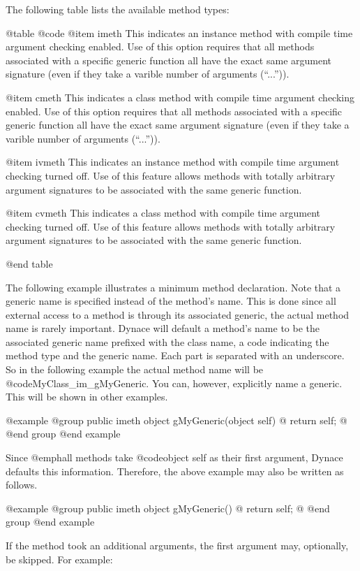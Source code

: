 The following table lists the available method types:

@table @code
@item imeth
This indicates an instance method with compile time argument checking
enabled.  Use of this option requires that all methods associated
with a specific generic function all have the exact same argument
signature (even if they take a varible number of arguments (``...'')).

@item cmeth
This indicates a class method with compile time argument checking
enabled.  Use of this option requires that all methods associated with
a specific generic function all have the exact same argument signature
(even if they take a varible number of arguments (``...'')).

@item ivmeth
This indicates an instance method with compile time argument checking
turned off.  Use of this feature allows methods with totally arbitrary
argument signatures to be associated with the same generic function.

@item cvmeth
This indicates a class method with compile time argument checking
turned off.  Use of this feature allows methods with totally arbitrary
argument signatures to be associated with the same generic function.


@end table

The following example illustrates a minimum method declaration.  Note
that a generic name is specified instead of the method's name.  This is
done since all external access to a method is through its associated
generic, the actual method name is rarely important.  Dynace will
default a method's name to be the associated generic name prefixed with
the class name, a code indicating the method type and the generic name.
Each part is separated with an underscore.  So in the following example
the actual method name will be @code{MyClass_im_gMyGeneric}.  You can,
however, explicitly name a generic.  This will be shown in other
examples.

@example
@group
public  imeth   object  gMyGeneric(object self)
@{
        return self;
@}
@end group
@end example


Since @emph{all} methods take @code{object self} as their first argument,
Dynace defaults this information.  Therefore, the above example may also
be written as follows.  


@example
@group
public  imeth   object  gMyGeneric()
@{
        return self;
@}
@end group
@end example


If the method took an additional arguments, the first argument may,
optionally, be skipped.  For example:

